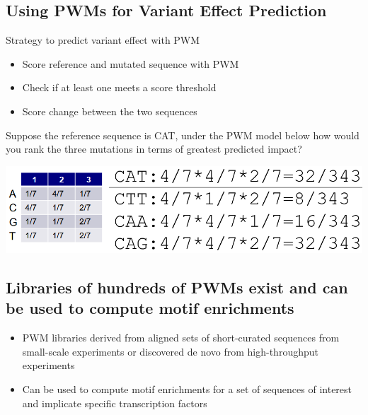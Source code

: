 \documentclass[10pt]{article}
\begin{document}
\subsection*{Using PWMs for Variant Effect Prediction}
Strategy to predict variant effect with PWM
\begin{itemize}
	\item Score reference and mutated sequence with PWM
	\item Check if at least one meets a score threshold
	\item Score change between the two sequences
\end{itemize}
Suppose the reference sequence is CAT, under the PWM model below how would you rank the three mutations in terms of greatest predicted impact?
\begin{center} 
	\includegraphics*[width=\textwidth]{W7_13.png} 
\end{center}

\subsection*{Libraries of hundreds of PWMs exist and can be used to compute motif enrichments}
\begin{itemize}
	\item PWM libraries derived from aligned sets of short-curated sequences from small-scale experiments or discovered de novo from high-throughput experiments
	\item Can be used to compute motif enrichments for a set of sequences of interest and implicate specific transcription factors
\end{itemize}
\end{document}
